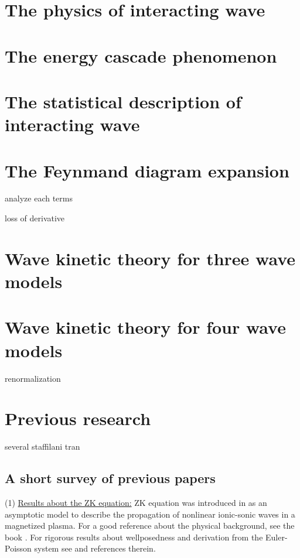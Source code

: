 \section{The physics of interacting wave}


\section{The energy cascade phenomenon}

\section{The statistical description of interacting wave}

\section{The Feynmand diagram expansion}

analyze each terms

loss of derivative

\section{Wave kinetic theory for three wave models}

\section{Wave kinetic theory for four wave models}

renormalization

\section{Previous research}

several staffilani tran 

\subsection{A short survey of previous papers} (1) \underline{Results about the ZK equation:} ZK equation was introduced in \cite{zakharov1974three} as an asymptotic model to describe the propagation of nonlinear ionic-sonic waves in a magnetized plasma. For a good reference about the physical background, see the book \cite{davidson2012methods}. For rigorous results about wellposedness and derivation from the Euler-Poisson system see \cite{lannes2013cauchy} and references therein.

